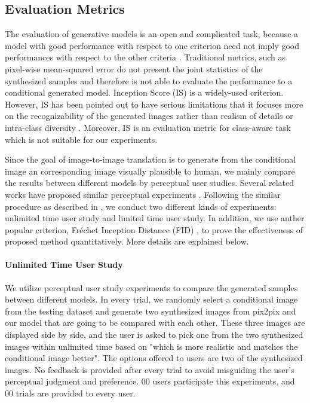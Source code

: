 \subsection{ Evaluation Metrics}
\label{subsec:ablation}
The evaluation of generative models is an open and complicated task, because a model with good performance with respect to one criterion need not imply good performances with respect to the other criteria \cite{evaluation, GANs_equal}. Traditional metrics, such as pixel-wise mean-squared error do not present the joint statistics of the synthesized samples and therefore is not able to evaluate the performance to a conditional generated model. 
Inception Score (IS) \cite{Improved_Techniques} is a widely-used criterion. However, IS has been pointed out to have serious limitations that it focuses more on the recognizability of the generated images rather than realism of details or intra-class diversity \cite{evaluation}. Moreover, IS is an evaluation metric for class-aware task which is not suitable for our experiments.
 
Since the goal of image-to-image translation is to generate from the conditional image an corresponding image visually plausible to human, we mainly compare the results between different models by perceptual user studies. Several related works have proposed similar perceptual experiments \cite{LaplaceGANs, SRGANs, Improved_Techniques, CRN, pix2pixHD}. Following the similar procedure as described in \cite{CRN}, we conduct two different kinds of experiments: unlimited time user study and limited time user study. 
In addition, we use anther popular criterion, Fr\'echet Inception Distance (FID) \cite{FID}, to prove the effectiveness of proposed method quantitatively. More details are explained below.
\paragraph{Unlimited Time User Study}
We utilize perceptual user study experiments to compare the generated samples between different models. In every trial, we randomly select a conditional image from the testing dataset and generate two synthesized images from pix2pix and our model that are going to be compared with each other. These three images are displayed side by side, and the user is asked to pick one from the two synthesized images within unlimited time based on "which is more realistic and matches the conditional image better". The options offered to users are two of the synthesized images. No feedback is provided after every trial to avoid misguiding the user's perceptual judgment and preference. 00 users participate this experiments, and 00 trials are provided to every user. 
